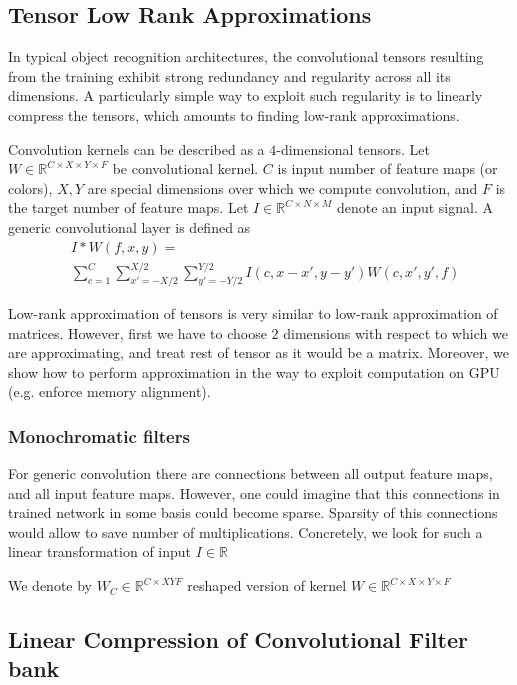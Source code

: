 \documentclass{article}
\begin{document}
\subsection{Tensor Low Rank Approximations}

In typical object recognition architectures, the convolutional tensors resulting
from the training exhibit strong redundancy and regularity across all its 
dimensions. A particularly simple way to exploit such regularity is to 
linearly compress the tensors, which amounts to finding low-rank 
approximations.

Convolution kernels can be described as a $4$-dimensional tensors. Let $W \in \mathbb{R}^{C \times X \times Y \times F}$ 
be convolutional kernel. 
$C$ is input number of feature maps (or colors), $X, Y$ are special dimensions
over which we compute convolution, and $F$ is the target number of feature maps.
Let $I \in \mathbb{R}^{C \times N \times M}$ denote an input signal.
A generic convolutional layer is defined as
\begin{align*}
\label{convlayereq}
&I \ast W (f,x,y) = \\
&\sum_{c=1}^C \sum_{x'=-X/2}^{X/2} \sum_{y'=-Y/2}^{Y/2} I(c,x-x',y-y') W(c,x',y',f)
\end{align*}

Low-rank approximation of tensors is very similar to low-rank approximation of matrices.
However, first we have to choose $2$ dimensions with respect to which we are approximating, and treat
rest of tensor as it would be a matrix. Moreover, we show how to perform approximation in the way to
exploit computation on GPU (e.g. enforce memory alignment).


\subsubsection{Monochromatic filters}
For generic convolution there are connections between all output feature maps, and all input feature maps.
However, one could imagine that this connections in trained network in some basis could become sparse. 
Sparsity of this connections would allow to save number of multiplications. Concretely, we look for such a 
linear transformation of input $I \in \mathbb{R}$ 




We denote by $W_C \in \mathbb{R}^{C \times XYF}$ reshaped version of kernel $W \in \mathbb{R}^{C \times X \times Y \times F}$


\subsection{Linear Compression of Convolutional Filter bank}
\end{document}

